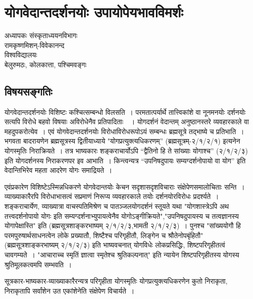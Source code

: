 {\fontsize{15}{17}\selectfont
\chapter{योगवेदान्तदर्शनयोः  उपायोपेयभावविमर्शः}

\begin{center}
\smallskip

अध्यापकः संस्कृताध्ययनविभागः\\
रामकृष्णमिशन्-विवेकानन्द\\
विश्वविद्यालयः\\
बेलुरुमठः, कोलकात्ता, पश्चिमवङ्गः
\addrule
\end{center}

\section*{विषयसङ्गतिः}

योगवेदान्तदर्शनयोः विशिष्टः कश्चित्सम्बन्धो विलसति~। परमतात्पर्यार्थे तात्त्विकांशे वा नूनमनयोः दर्शनयोः सत्यपि विरोधे बहवो विषयाः अविरोधेनैव प्रतिपादिताः~~। योगदर्शनं वेदान्तम् अनुष्ठानस्तरे व्यवहारकाले वा महदुपकरोत्येव~। एवं योगवेदान्तदर्शनयोः विरोधाविरोधरूपोऽयं सम्बन्धः ब्रह्मसूत्रे तद्भाष्ये च प्रतिभाति~। भगवता बादरायणेन ब्रह्मसूत्रस्य द्वितीयाध्याये "योगप्रत्युक्त्यधिकरणम्” (ब्रह्मसूत्रम्-२/१/२/१) इत्यनेन योगस्मृतिः निराक्रियते~। तत्र भाष्यकारः शङ्कराचार्योऽपि “द्वैतिनो हि ते सांख्याः योगाश्च” (२/१/२/३) इति योगदर्शनस्य निराकरणपर इव आभाति~। किन्त्वन्यत्र “उपनिषदुपायः सम्यग्दर्शनोपायो वा योग” इति वेदान्तिभिरेव महता आदरेण योगः समाद्रियते~। 

एवंप्रकारेण विशिष्टेऽस्मिन्नधिकरणे योगवेदान्तयोः केचन सदृशासदृशविचाराः संक्षेपेणसमालोचिताः सन्ति~। व्याख्याकारैरपि विरोधाभासत्वं सप्रमाणं निरूप्य व्यवहारकाले तयोः दर्शनयोरविरोधः प्रदर्श्यते~। शङ्कराचार्येण, व्याख्यात्रा वाचस्पतिमिश्रेण च पातञ्जलयोगदर्शनं स्तूयते यथा "योगशास्त्रेऽपि अथ तत्त्वदर्शनोपायो योगः इति सम्यग्दर्शनाभ्युपायत्वेनैव योगोऽङ्गीक्रियते","उपनिषदुपायस्य च तत्वज्ञानस्य योगापेक्षास्ति" इति (ब्रह्मसूत्रशाङ्करभाष्यम् २/१/२/३,भामती २/१/२/३)~। पुनश्च "सांख्ययोगौ हि परमपुरुषार्थसाधनत्वेन लोके प्रख्यातौ, शिष्टैश्च परिगृहीतौ, लिङ्गेन च श्रौतेनोपबृंहितौ" (ब्रह्मसूत्रशाङ्करभाष्यम् २/१/२/३) इति भाष्यवचनात् योगविधेः लोकप्रसिद्धिः, शिष्टपरिगृहीतत्वं चावगम्यते~। "आचाराच्च स्मृतिं ज्ञात्वा स्मृतेश्च श्रुतिकल्पनात्" इति न्यायेन शिष्टपरिगृहीतस्य योगस्य श्रुतिमूलकत्वमपि सम्भवति~। 

सूत्रकार-भाष्यकार-व्याख्याकारैरन्यत्र परिगृहीता योगस्मृतिः योगप्रत्युक्त्यधिकरणेन कुतो निराकृता, निराकृतापि सर्वांशेन उत एकांशेनेति संक्षेपेण विचार्यते~। 

}
